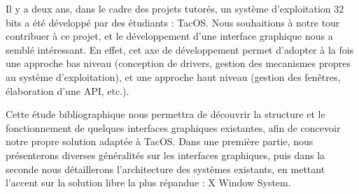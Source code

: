 Il y a deux ans, dans le cadre des projets tutorés, un système d'exploitation 32 bits a été développé par des étudiants : TacOS. Nous souhaitions à notre tour contribuer à ce projet, et le développement d'une interface graphique nous a semblé intéressant. En effet, cet axe de développement permet d'adopter à la fois une approche bas niveau (conception de drivers, gestion des mecanismes propres au système d'exploitation), et une approche haut niveau (gestion des fenêtres, élaboration d'une API, etc.).

Cette étude bibliographique nous permettra de découvrir la structure et le fonctionnement de quelques interfaces graphiques existantes, afin de concevoir notre propre solution adaptée à TacOS. Dans une première partie, nous présenterons diverses généralités sur les interfaces graphiques, puis dans la seconde nous détaillerons l'architecture des systèmes existants, en mettant l'accent sur la solution libre la plus répandue : X Window System.
